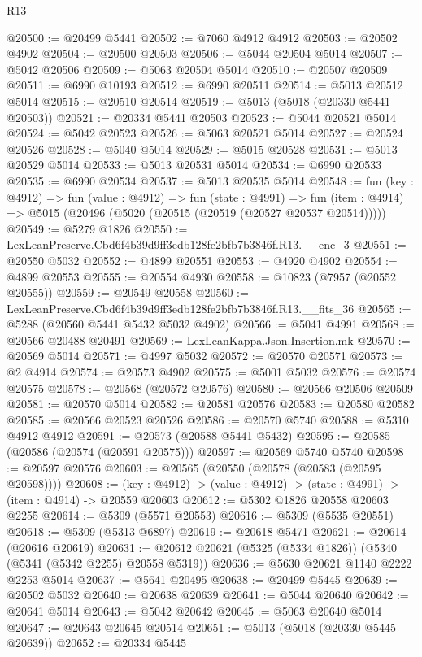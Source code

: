 \begin{lexlean}{R13}
\begin{coremodule}
@20500 := @20499 @5441
@20502 := @7060 @4912 @4912
@20503 := @20502 @4902
@20504 := @20500 @20503
@20506 := @5044 @20504 @5014
@20507 := @5042 @20506
@20509 := @5063 @20504 @5014
@20510 := @20507 @20509
@20511 := @6990 @10193
@20512 := @6990 @20511
@20514 := @5013 @20512 @5014
@20515 := @20510 @20514
@20519 := @5013 (@5018 (@20330 @5441 @20503))
@20521 := @20334 @5441 @20503
@20523 := @5044 @20521 @5014
@20524 := @5042 @20523
@20526 := @5063 @20521 @5014
@20527 := @20524 @20526
@20528 := @5040 @5014
@20529 := @5015 @20528
@20531 := @5013 @20529 @5014
@20533 := @5013 @20531 @5014
@20534 := @6990 @20533
@20535 := @6990 @20534
@20537 := @5013 @20535 @5014
@20548 := fun (key : @4912) =>
  fun (value : @4912) =>
  fun (state : @4991) =>
  fun (item : @4914) => @5015 (@20496 (@5020 (@20515 (@20519 (@20527 @20537 @20514)))))
@20549 := @5279 @1826
@20550 := LexLeanPreserve.Cbd6f4b39d9ff3edb128fe2bfb7b3846f.R13.__enc_3
@20551 := @20550 @5032
@20552 := @4899 @20551
@20553 := @4920 @4902
@20554 := @4899 @20553
@20555 := @20554 @4930
@20558 := @10823 (@7957 (@20552 @20555))
@20559 := @20549 @20558
@20560 := LexLeanPreserve.Cbd6f4b39d9ff3edb128fe2bfb7b3846f.R13.__fits_36
@20565 := @5288 (@20560 @5441 @5432 @5032 @4902)
@20566 := @5041 @4991
@20568 := @20566 @20488 @20491
@20569 := LexLeanKappa.Json.Insertion.mk
@20570 := @20569 @5014
@20571 := @4997 @5032
@20572 := @20570 @20571
@20573 := @2 @4914
@20574 := @20573 @4902
@20575 := @5001 @5032
@20576 := @20574 @20575
@20578 := @20568 (@20572 @20576)
@20580 := @20566 @20506 @20509
@20581 := @20570 @5014
@20582 := @20581 @20576
@20583 := @20580 @20582
@20585 := @20566 @20523 @20526
@20586 := @20570 @5740
@20588 := @5310 @4912 @4912
@20591 := @20573 (@20588 @5441 @5432)
@20595 := @20585 (@20586 (@20574 (@20591 @20575)))
@20597 := @20569 @5740 @5740
@20598 := @20597 @20576
@20603 := @20565 (@20550 (@20578 (@20583 (@20595 @20598))))
@20608 := (key : @4912) -> (value : @4912) -> (state : @4991) -> (item : @4914) -> @20559 @20603
@20612 := @5302 @1826 @20558 @20603 @2255
@20614 := @5309 (@5571 @20553)
@20616 := @5309 (@5535 @20551)
@20618 := @5309 (@5313 @6897)
@20619 := @20618 @5471
@20621 := @20614 (@20616 @20619)
@20631 := @20612 @20621 (@5325 (@5334 @1826)) (@5340 (@5341 (@5342 @2255) @20558 @5319))
@20636 := @5630 @20621 @1140 @2222 @2253 @5014
@20637 := @5641 @20495
@20638 := @20499 @5445
@20639 := @20502 @5032
@20640 := @20638 @20639
@20641 := @5044 @20640
@20642 := @20641 @5014
@20643 := @5042 @20642
@20645 := @5063 @20640 @5014
@20647 := @20643 @20645 @20514
@20651 := @5013 (@5018 (@20330 @5445 @20639))
@20652 := @20334 @5445

\end{coremodule}
\end{lexlean}

